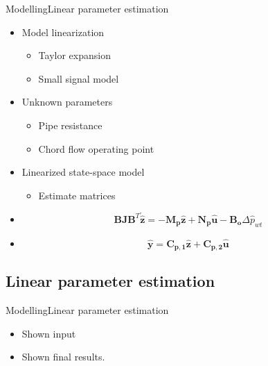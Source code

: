 \begin{frame}{Modelling}{Linear parameter estimation}
\begin{itemize}
	\item<1-> Model linearization
	\begin{itemize}
		\item<1-> Taylor expansion
		\item<1-> Small signal model
	\end{itemize}	
\end{itemize}

\begin{itemize}
	\item<2-> Unknown parameters
	\begin{itemize}
		\item<2-> Pipe resistance
		\item<2-> Chord flow operating point
	\end{itemize}	
\end{itemize}

\begin{itemize}
	\item<3-> Linearized state-space model
	\begin{itemize}
		\item<3-> Estimate matrices
	\end{itemize}
\end{itemize}	

\begin{itemize}
	\item<3->[]
		\begin{equation}
		\pmb{B}\pmb{J {B}}^T \pmb{\dot{\hat{z}}} = -\pmb{M_p} \pmb{\hat{z}} + \pmb{N_p} \pmb{\hat{u}} - \pmb{B_o} \Delta \hat{p}_{wt} 
		\end{equation}
	\item<3->[]
		\begin{equation}
		\pmb{\hat{y}} = \pmb{C_{p,1}} \pmb{\hat{z}}  + \pmb{C_{p,2}}\pmb{\hat{u}}  
		\end{equation}	
\end{itemize}
\end{frame}


\subsection{Linear parameter estimation}

\begin{frame}{Modelling}{Linear parameter estimation}
\begin{itemize}
	\item<1-> Shown input
	\item<1-> Shown final results.
\end{itemize}
\end{frame}




